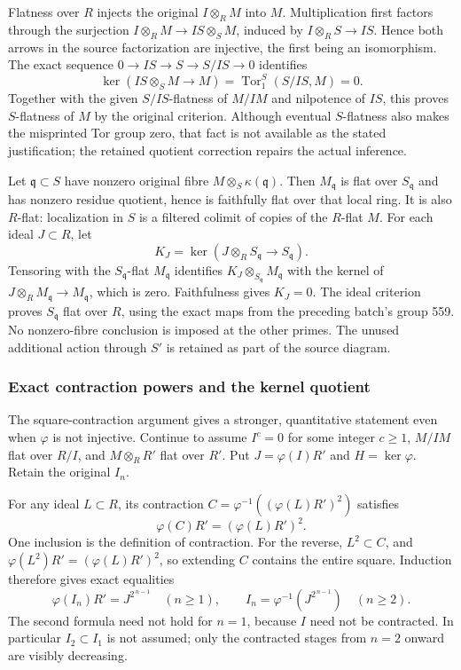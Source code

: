 Flatness over \(R\) injects the original \(I\otimes_RM\) into \(M\). Multiplication first factors through the surjection \(I\otimes_RM\to IS\otimes_SM\), induced by \(I\otimes_RS\to IS\). Hence both arrows in the source factorization are injective, the first being an isomorphism. The exact sequence \(0\to IS\to S\to S/IS\to0\) identifies \[
\ker(IS\otimes_SM\to M)=\operatorname{Tor}_1^S(S/IS,M)=0.
\] Together with the given \(S/IS\)-flatness of \(M/IM\) and nilpotence of \(IS\), this proves \(S\)-flatness of \(M\) by the original criterion. Although eventual \(S\)-flatness also makes the misprinted Tor group zero, that fact is not available as the stated justification; the retained quotient correction repairs the actual inference.

Let \(\mathfrak q\subset S\) have nonzero original fibre \(M\otimes_S\kappa(\mathfrak q)\). Then \(M_{\mathfrak q}\) is flat over \(S_{\mathfrak q}\) and has nonzero residue quotient, hence is faithfully flat over that local ring. It is also \(R\)-flat: localization in \(S\) is a filtered colimit of copies of the \(R\)-flat \(M\). For each ideal \(J\subset R\), let \[
K_J=\ker(J\otimes_RS_{\mathfrak q}\to S_{\mathfrak q}).
\] Tensoring with the \(S_{\mathfrak q}\)-flat \(M_{\mathfrak q}\) identifies \(K_J\otimes_{S_{\mathfrak q}}M_{\mathfrak q}\) with the kernel of \(J\otimes_RM_{\mathfrak q}\to M_{\mathfrak q}\), which is zero. Faithfulness gives \(K_J=0\). The ideal criterion proves \(S_{\mathfrak q}\) flat over \(R\), using the exact maps from the preceding batch's group 559. No nonzero-fibre conclusion is imposed at the other primes. The unused additional action through \(S'\) is retained as part of the source diagram.

\subsubsection{Exact contraction powers and the kernel quotient}\label{algebra-proof-017-exact-contraction-powers-and-the-kernel-quotient}

The square-contraction argument gives a stronger, quantitative statement even when \(\varphi\) is not injective. Continue to assume \(I^c=0\) for some integer \(c\geq1\), \(M/IM\) flat over \(R/I\), and \(M\otimes_RR'\) flat over \(R'\). Put \(J=\varphi(I)R'\) and \(H=\ker\varphi\). Retain the original \(I_n\).

For any ideal \(L\subset R\), its contraction \(C=\varphi^{-1}((\varphi(L)R')^2)\) satisfies \[
\varphi(C)R'=(\varphi(L)R')^2.
\] One inclusion is the definition of contraction. For the reverse, \(L^2\subset C\), and \(\varphi(L^2)R'=(\varphi(L)R')^2\), so extending \(C\) contains the entire square. Induction therefore gives exact equalities \[
\varphi(I_n)R'=J^{2^{\,n-1}}\quad(n\geq1),
\qquad
I_n=\varphi^{-1}(J^{2^{\,n-1}})\quad(n\geq2).
\] The second formula need not hold for \(n=1\), because \(I\) need not be contracted. In particular \(I_2\subset I_1\) is not assumed; only the contracted stages from \(n=2\) onward are visibly decreasing.


